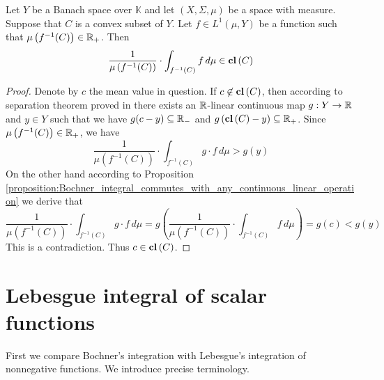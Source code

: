 \begin{proposition}\label{proposition:if_function_admit_values_in_convex_set_then_the_mean_value_is_also_in_that_set}
    Let $Y$ be a Banach space over $\mathbb{K}$ and let $(X,\Sigma,\mu)$ be a space with measure. Suppose that $C$ is a convex subset of $Y$. Let $f \in L^1(\mu,Y)$ be a function such that $\mu\left(f^{-1}(C)\right) \in {\mathbb R}_+$. Then
    $$\frac{1}{\mu\left(f^{-1}(C)\right)}\cdot \int_{f^{-1}(C)}f\,d\mu \in \mathbf{cl}\left(C\right)$$
\end{proposition}
\begin{proof}
    Denote by $c$ the mean value in question. If $c \not \in \mathbf{cl}\left(C\right)$, then according to separation theorem proved in \cite{Hahn_Banach} there exists an ${\mathbb R}$-linear continuous map $g:Y\rightarrow {\mathbb R}$ and $y \in Y$ such that we have $g(c - y) \subseteq {\mathbb R}_-$ and $g\left(\mathbf{cl}\left(C\right) - y\right)\subseteq {\mathbb R}_+$. Since $\mu\left(f^{-1}(C)\right) \in {\mathbb R}_+$, we have
    $$\frac{1}{\mu\left(f^{-1}(C)\right)}\cdot \int_{f^{-1}(C)} g\cdot f\,d\mu > g(y)$$
    On the other hand according to Proposition \ref{proposition:Bochner_integral_commutes_with_any_continuous_linear_operation} we derive that
    $$\frac{1}{\mu\left(f^{-1}(C)\right)}\cdot \int_{f^{-1}(C)} g\cdot f\,d\mu = g\left(\frac{1}{\mu\left(f^{-1}(C)\right)}\cdot \int_{f^{-1}(C)}f\,d\mu\right) = g(c) < g(y)$$
    This is a contradiction. Thus $c \in \mathbf{cl}\left(C\right)$.
\end{proof}

\section{Lebesgue integral of scalar functions}
\noindent
First we compare Bochner's integration with Lebesgue's integration of nonnegative functions. We introduce precise terminology.

